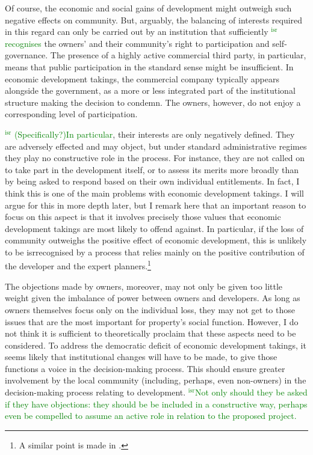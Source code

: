 \documentclass[12pt,a4paper]{book} %
\newcommand{\isr}[1]{\textcolor{green}{$^{\textrm{isr}}${#1}}}
\begin{document}
Of course, the economic and social gains of development might outweigh such negative effects on community. But, arguably, the balancing of interests required in this regard can only be carried out by an institution that sufficiently \isr{recognises} the owners' and their community's right to participation and self-governance. The presence of a highly active commercial third party, in particular, means that public participation in the standard sense might be insufficient. In economic development takings, the commercial company typically appears alongside the government, as a more or less integrated part of the institutional structure making the decision to condemn. The owners, however, do not enjoy a corresponding level of participation.

\isr{ (Specifically?)In particular}, their interests are only negatively defined. They are adversely effected and may object, but under standard administrative regimes they play no constructive role in the process. For instance, they are not called on to take part in the development itself, or to assess its merits more broadly than by being asked to respond based on their own individual entitlements. In fact, I think this is one of the main problems with economic development takings. I will argue for this in more depth later, but I remark here that an important reason to focus on this aspect is that it involves precisely those values that economic development takings are most likely to offend against. In particular, if the loss of community outweighs the positive effect of economic development, this is unlikely to be isr{recognised} by a process that relies mainly on the positive contribution of the developer and the expert planners.\footnote{A similar point is made in \cite{underkuffler06}.} 

The objections made by owners, moreover, may not only be given too little weight given the imbalance of power between owners and developers. As long as owners themselves focus only on the individual loss, they may not get to those issues that are the most important for property's social function. However, I do not think it is sufficient to theoretically proclaim that these aspects need to be considered. To address the democratic deficit of economic development takings, it seems likely that institutional changes will have to be made, to give those functions a voice in the decision-making process. This should ensure greater involvement by the local community (including, perhaps, even non-owners) in the decision-making process relating to development. \isr{Not only should they be asked if they have objections: they should be be included in a constructive way, perhaps even be compelled to assume an active role in relation to the proposed project.}
\end{document}
